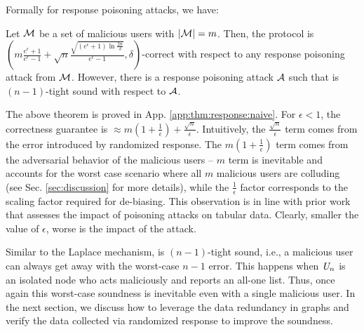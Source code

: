 Formally
for response poisoning attacks, we have:
\begin{thm}\label{thm:b3a2_hard} 
Let $\mathcal{M}$ be a set of malicious users with $|\mathcal{M}| = m$. Then, 
the \DegRRNaive{} protocol is $(m\frac{e^\epsilon+1}{e^\epsilon-1}+\sqrt{n}\frac{\sqrt{(e^\epsilon+1)\ln\frac{2n}{\delta}}}{e^\epsilon-1},\delta)$-correct with respect to any response poisoning attack from $\mathcal{M}$. However, there is a response poisoning attack $\mathcal{A}$ such that \DegRRNaive{} is $(n-1)$-tight sound with respect to $\mathcal{A}$.
\label{thm:response:naive}\end{thm}
The above theorem is proved in App. \ref{app:thm:response:naive}.
For $\epsilon < 1$, the correctness guarantee is $\approx m(1+\frac{1}{\epsilon})+\frac{\sqrt{n}}{\epsilon}$. Intuitively, the $\frac{\sqrt{n}}{\epsilon}$ term comes from the error introduced by randomized response. The $m(1+\frac{1}{\epsilon})$ term comes from the adversarial behavior of the malicious users -- $m$ term is inevitable and 
 accounts for the worst case scenario where all $m$ malicious users are colluding  (see Sec. \ref{sec:discussion}  for more details), while the $\frac{1}{\epsilon}$ factor corresponds to the scaling factor required for de-biasing. This observation is in line with prior work \cite{Cheu21} that assesses the impact of poisoning attacks on tabular data.  Clearly, smaller the value of $\epsilon$, worse is the impact of the attack.   %


Similar to the Laplace mechanism, \DegRRNaive{} is $(n-1)$-tight sound, i.e., a malicious user can always get away with the worst-case $n-1$ error. This happens when $\textit{U}_n$ is an isolated node who acts maliciously and reports an all-one list. Thus, once again this  worst-case soundness is inevitable even with a single malicious user.   In the next section, we discuss how to leverage the data redundancy in graphs and verify the data collected via randomized response to improve the soundness.



